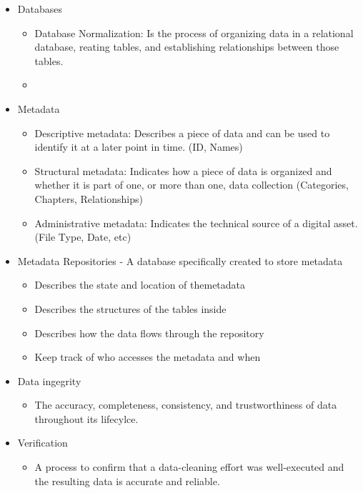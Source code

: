 \documentclass[a4paper]{article}
\begin{document}
\begin{itemize}
        \item Databases
            \begin{itemize}
                \item Database Normalization: Is the process of organizing data in a relational database, reating tables, and establishing relationships between those tables.
                \item 
            \end{itemize}

        \item  Metadata
            \begin{itemize}
                \item Descriptive metadata: Describes a piece of data and can be used to identify it at a later point in time. (ID, Names)
                \item Structural metadata: Indicates how a piece of data is organized and whether it is part of one, or more than one, data collection (Categories, Chapters, Relationships)
                \item Administrative metadata: Indicates the technical source of a digital asset. (File Type, Date, etc)
            \end{itemize}

        \item Metadata Repositories - A database specifically created to store metadata
            \begin{itemize}
                \item Describes the state and location of themetadata
                \item Describes the structures of the tables inside
                \item Describes how the data flows through the repository
                \item Keep track of who accesses the metadata and when
            \end{itemize}

        \item Data ingegrity
            \begin{itemize}
                \item The accuracy, completeness, consistency, and trustworthiness of data throughout its lifecylce.
            \end{itemize}

        \item Verification 
            \begin{itemize}
                \item A process to confirm that a data-cleaning effort was well-executed and the resulting data is accurate and reliable.
            \end{itemize}
            

\end{itemize}
\end{document}
